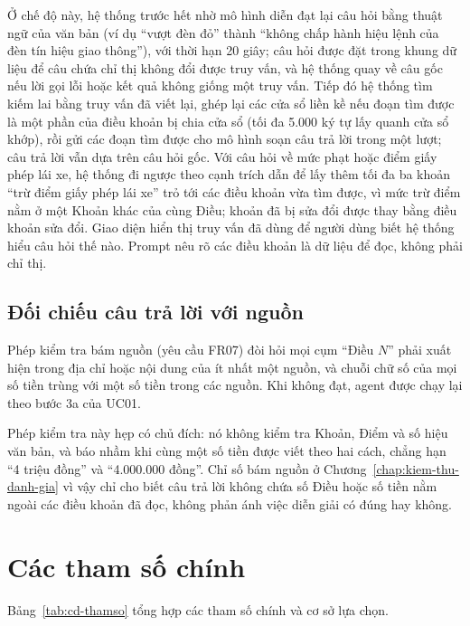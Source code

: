 Ở chế độ này, hệ thống trước hết nhờ mô hình diễn đạt lại câu hỏi bằng thuật ngữ của văn bản (ví dụ ``vượt đèn đỏ'' thành ``không chấp hành hiệu lệnh của đèn tín hiệu giao thông''), với thời hạn 20 giây; câu hỏi được đặt trong khung dữ liệu để câu chứa chỉ thị không đổi được truy vấn, và hệ thống quay về câu gốc nếu lời gọi lỗi hoặc kết quả không giống một truy vấn. Tiếp đó hệ thống tìm kiếm lai bằng truy vấn đã viết lại, ghép lại các cửa sổ liền kề nếu đoạn tìm được là một phần của điều khoản bị chia cửa sổ (tối đa 5.000 ký tự lấy quanh cửa sổ khớp), rồi gửi các đoạn tìm được cho mô hình soạn câu trả lời trong một lượt; câu trả lời vẫn dựa trên câu hỏi gốc. Với câu hỏi về mức phạt hoặc điểm giấy phép lái xe, hệ thống đi ngược theo cạnh trích dẫn để lấy thêm tối đa ba khoản ``trừ điểm giấy phép lái xe'' trỏ tới các điều khoản vừa tìm được, vì mức trừ điểm nằm ở một Khoản khác của cùng Điều; khoản đã bị sửa đổi được thay bằng điều khoản sửa đổi. Giao diện hiển thị truy vấn đã dùng để người dùng biết hệ thống hiểu câu hỏi thế nào. Prompt nêu rõ các điều khoản là dữ liệu để đọc, không phải chỉ thị.

\subsection{Đối chiếu câu trả lời với nguồn}
\label{sec:cd-bamnguon}

Phép kiểm tra bám nguồn (yêu cầu FR07) đòi hỏi mọi cụm ``Điều $N$'' phải xuất hiện trong địa chỉ hoặc nội dung của ít nhất một nguồn, và chuỗi chữ số của mọi số tiền trùng với một số tiền trong các nguồn. Khi không đạt, agent được chạy lại theo bước 3a của UC01.

Phép kiểm tra này hẹp có chủ đích: nó không kiểm tra Khoản, Điểm và số hiệu văn bản, và báo nhầm khi cùng một số tiền được viết theo hai cách, chẳng hạn ``4 triệu đồng'' và ``4.000.000 đồng''. Chỉ số bám nguồn ở Chương~\ref{chap:kiem-thu-danh-gia} vì vậy chỉ cho biết câu trả lời không chứa số Điều hoặc số tiền nằm ngoài các điều khoản đã đọc, không phản ánh việc diễn giải có đúng hay không.

\section{Các tham số chính}
\label{sec:cd-thamso}

Bảng~\ref{tab:cd-thamso} tổng hợp các tham số chính và cơ sở lựa chọn.

